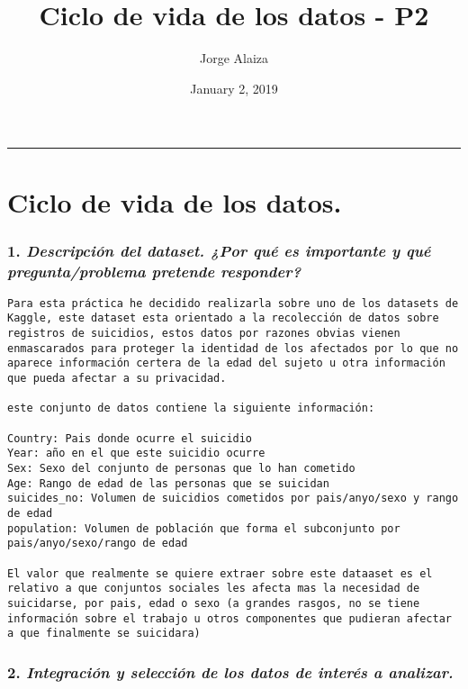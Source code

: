 \documentclass[]{article}
\title{Ciclo de vida de los datos - P2}
\author{Jorge Alaiza}
\date{January 2, 2019}
\begin{document}
\maketitle

\begin{center}\rule{0.5\linewidth}{\linethickness}\end{center}

\section{Ciclo de vida de los datos.}\label{ciclo-de-vida-de-los-datos.}

\subsubsection{\texorpdfstring{1. \emph{Descripción del dataset. ¿Por
qué es importante y qué pregunta/problema pretende
responder?}}{1. Descripción del dataset. ¿Por qué es importante y qué pregunta/problema pretende responder?}}\label{descripcion-del-dataset.-por-que-es-importante-y-que-preguntaproblema-pretende-responder}

\begin{verbatim}
Para esta práctica he decidido realizarla sobre uno de los datasets de Kaggle, este dataset esta orientado a la recolección de datos sobre registros de suicidios, estos datos por razones obvias vienen enmascarados para proteger la identidad de los afectados por lo que no aparece información certera de la edad del sujeto u otra información que pueda afectar a su privacidad.

este conjunto de datos contiene la siguiente información:

Country: Pais donde ocurre el suicidio
Year: año en el que este suicidio ocurre
Sex: Sexo del conjunto de personas que lo han cometido
Age: Rango de edad de las personas que se suicidan
suicides_no: Volumen de suicidios cometidos por pais/anyo/sexo y rango de edad
population: Volumen de población que forma el subconjunto por pais/anyo/sexo/rango de edad

El valor que realmente se quiere extraer sobre este dataaset es el relativo a que conjuntos sociales les afecta mas la necesidad de suicidarse, por pais, edad o sexo (a grandes rasgos, no se tiene información sobre el trabajo u otros componentes que pudieran afectar a que finalmente se suicidara)
\end{verbatim}

\subsubsection{\texorpdfstring{2. \emph{Integración y selección de los
datos de interés a
analizar.}}{2. Integración y selección de los datos de interés a analizar.}}\label{integracion-y-seleccion-de-los-datos-de-interes-a-analizar.}
\end{document}
